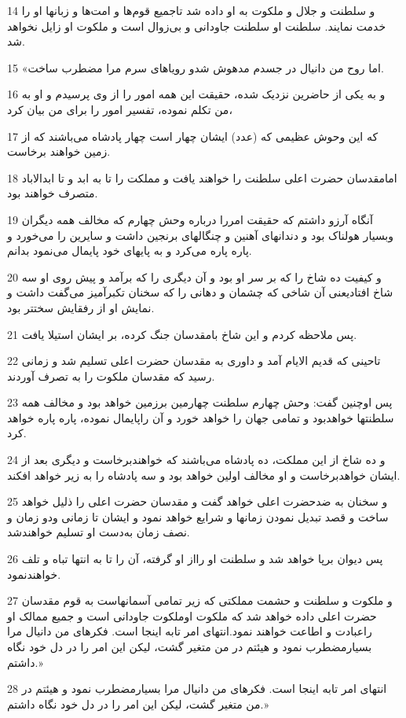 \par 14 و سلطنت و جلال و ملکوت به او داده شد تاجمیع قوم‌ها و امت‌ها و زبانها او را خدمت نمایند. سلطنت او سلطنت جاودانی و بی‌زوال است و ملکوت او زایل نخواهد شد.
\par 15 «اما روح من دانیال در جسدم مدهوش شدو رویاهای سرم مرا مضطرب ساخت.
\par 16 و به یکی از حاضرین نزدیک شده، حقیقت این همه امور را از وی پرسیدم و او به من تکلم نموده، تفسیر امور را برای من بیان کرد،
\par 17 که این وحوش عظیمی که (عدد) ایشان چهار است چهار پادشاه می‌باشند که از زمین خواهند برخاست.
\par 18 امامقدسان حضرت اعلی سلطنت را خواهند یافت و مملکت را تا به ابد و تا ابدالاباد متصرف خواهند بود.
\par 19 آنگاه آرزو داشتم که حقیقت امررا درباره وحش چهارم که مخالف همه دیگران وبسیار هولناک بود و دندانهای آهنین و چنگالهای برنجین داشت و سایرین را می‌خورد و پاره پاره می‌کرد و به پایهای خود پایمال می‌نمود بدانم.
\par 20 و کیفیت ده شاخ را که بر سر او بود و آن دیگری را که برآمد و پیش روی او سه شاخ افتادیعنی آن شاخی که چشمان و دهانی را که سخنان تکبرآمیز می‌گفت داشت و نمایش او از رفقایش سختتر بود.
\par 21 پس ملاحظه کردم و این شاخ بامقدسان جنگ کرده، بر ایشان استیلا یافت.
\par 22 تاحینی که قدیم الایام آمد و داوری به مقدسان حضرت اعلی تسلیم شد و زمانی رسید که مقدسان ملکوت را به تصرف آوردند.
\par 23 پس اوچنین گفت: وحش چهارم سلطنت چهارمین برزمین خواهد بود و مخالف همه سلطنتها خواهدبود و تمامی جهان را خواهد خورد و آن راپایمال نموده، پاره پاره خواهد کرد.
\par 24 و ده شاخ از این مملکت، ده پادشاه می‌باشند که خواهندبرخاست و دیگری بعد از ایشان خواهدبرخاست و او مخالف اولین خواهد بود و سه پادشاه را به زیر خواهد افکند.
\par 25 و سخنان به ضدحضرت اعلی خواهد گفت و مقدسان حضرت اعلی را ذلیل خواهد ساخت و قصد تبدیل نمودن زمانها و شرایع خواهد نمود و ایشان تا زمانی ودو زمان و نصف زمان به‌دست او تسلیم خواهندشد.
\par 26 پس دیوان برپا خواهد شد و سلطنت او رااز او گرفته، آن را تا به انتها تباه و تلف خواهندنمود.
\par 27 و ملکوت و سلطنت و حشمت مملکتی که زیر تمامی آسمانهاست به قوم مقدسان حضرت اعلی داده خواهد شد که ملکوت اوملکوت جاودانی است و جمیع ممالک او راعبادت و اطاعت خواهند نمود.انتهای امر تابه اینجا است. فکرهای من دانیال مرا بسیارمضطرب نمود و هیئتم در من متغیر گشت، لیکن این امر را در دل خود نگاه داشتم.»
\par 28 انتهای امر تابه اینجا است. فکرهای من دانیال مرا بسیارمضطرب نمود و هیئتم در من متغیر گشت، لیکن این امر را در دل خود نگاه داشتم.»

